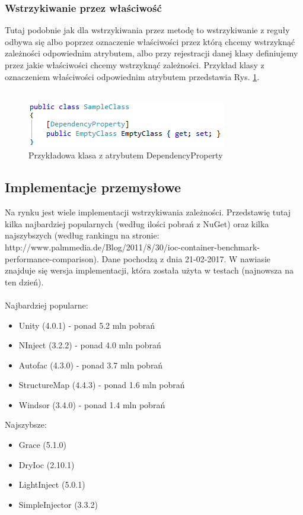 \documentclass[12pt]{article}
\begin{document}
\subsubsection{Wstrzykiwanie przez właściwość}
Tutaj podobnie jak dla wstrzykiwania przez metodę to wstrzykiwanie z reguły odbywa się albo poprzez oznaczenie właściwości przez którą chcemy wstrzyknąć zależności odpowiednim atrybutem, albo przy rejestracji danej klasy definiujemy przez jakie właściwości chcemy wstrzyknąć zależności. Przykład klasy z oznaczeniem właściwości odpowiednim atrybutem przedstawia Rys. \ref{fig:DependencyProperty}.\\ \\
\begin{figure}[H]
	\begin{center}
  		\includegraphics{DependencyProperty.png}
  		\caption{Przykładowa klasa z atrybutem DependencyProperty}
  		\label{fig:DependencyProperty}
	\end{center}
\end{figure}


\subsection{Implementacje przemysłowe}
Na rynku jest wiele implementacji wstrzykiwania zależności. Przedstawię tutaj kilka najbardziej popularnych (według ilości pobrań z NuGet) oraz kilka najszybszych (według rankingu na stronie: http://www.palmmedia.de/Blog/2011/8/30/ioc-container-benchmark-performance-comparison). Dane pochodzą z dnia 21-02-2017. W nawiasie znajduje się wersja implementacji, która została użyta w testach (najnowsza na ten dzień).\\
\\
Najbardziej popularne:
\begin{itemize}
	\item Unity (4.0.1) - ponad 5.2 mln pobrań
	\item NInject (3.2.2) - ponad 4.0 mln pobrań
	\item Autofac (4.3.0) - ponad 3.7 mln pobrań
	\item StructureMap (4.4.3) - ponad 1.6 mln pobrań
	\item Windsor (3.4.0) - ponad 1.4 mln pobrań
\end{itemize}
Najszybsze:
\begin{itemize}
	\item Grace (5.1.0)
	\item DryIoc (2.10.1)
	\item LightInject (5.0.1)
	\item SimpleInjector (3.3.2)
\end{itemize}
\end{document}
